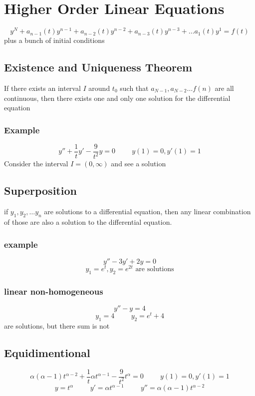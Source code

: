 \documentclass[fleqn]{report}
\newcommand{\hp}{\hspace{1cm}}
\begin{document}
\chapter{Higher Order Linear Equations}
\[
y^{N} + a_{n - 1}(t)y^{n - 1} + 
a_{n - 2}(t)y^{n - 2} + 
a_{n - 3}(t)y^{n - 3} + \ldots
a_{1}(t)y^{1}
=
f(t)
\]
plus a bunch of initial conditions

\section{Existence and Uniqueness Theorem}
If there exists an interval $I$ around $t_0$ such that $a_{N - 1}, a_{N - 2} \ldots f(n)$ are all continuous, then there exists one and only one solution for the differential equation

\subsection{Example}
\[
y'' + \frac{1}{t} y' - \frac{9}{t^2} y = 0
\hp
y(1) = 0, y'(1) = 1
\]
Consider the interval $I = (0, \infty)$ and see a solution


\section{Superposition}
if $y_{1}, y_{2}, \ldots y_{n}$ are solutions to a differential equation, then any linear combination of those are also a solution to the differential equation.


\subsection{example}
\[
y'' - 3y' + 2y = 0
\]
\[
y_1 = e^t, y_2 = e^{2t}
\textrm{ are solutions}
\]


\subsection{linear non-homogeneous}
\[
y'' - y = 4
\]
\[
y_1 = 4 
\hp
y_2 = e^t + 4
\]
are solutions, but there sum is not



\section{Equidimentional}
\[
\alpha (\alpha - 1)t^{\alpha - 2}
+
\frac{1}{t}
\alpha t^{\alpha - 1}
-
\frac{9}{t^2}
t^{\alpha}
=
0
\hp
y(1) = 0, y'(1) = 1
\]
\[
y = t^{\alpha}
\hp
y' = \alpha t^{\alpha - 1}
\hp
y'' = \alpha (\alpha - 1)t^{\alpha - 2}
\]
\end{document}
